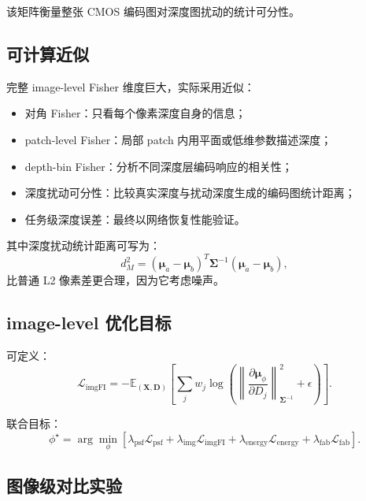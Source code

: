 \documentclass[11pt,a4paper,fontset=none]{ctexart}
\begin{document}
该矩阵衡量整张 CMOS 编码图对深度图扰动的统计可分性。

\subsection{可计算近似}

完整 image-level Fisher 维度巨大，实际采用近似：
\begin{itemize}
  \item 对角 Fisher：只看每个像素深度自身的信息；
  \item patch-level Fisher：局部 patch 内用平面或低维参数描述深度；
  \item depth-bin Fisher：分析不同深度层编码响应的相关性；
  \item 深度扰动可分性：比较真实深度与扰动深度生成的编码图统计距离；
  \item 任务级深度误差：最终以网络恢复性能验证。
\end{itemize}

其中深度扰动统计距离可写为：
\begin{equation}
  d_M^2
  =
  (\bm\mu_a-\bm\mu_b)^T
  \bm\Sigma^{-1}
  (\bm\mu_a-\bm\mu_b),
\end{equation}
比普通 L2 像素差更合理，因为它考虑噪声。

\subsection{image-level 优化目标}

可定义：
\begin{equation}
  \mathcal L_{\mathrm{imgFI}}
  =
  -
  \mathbb E_{(\bm X,\bm D)}
  \left[
  \sum_j
  w_j
  \log
  \left(
  \left\|
  \frac{\partial\bm\mu_\phi}{\partial D_j}
  \right\|_{\bm\Sigma^{-1}}^2
  +
  \epsilon
  \right)
  \right].
\end{equation}

联合目标：
\begin{equation}
  \phi^\star
  =
  \arg\min_\phi
  \left[
  \lambda_{\mathrm{psf}}\mathcal L_{\mathrm{psf}}
  +
  \lambda_{\mathrm{img}}\mathcal L_{\mathrm{imgFI}}
  +
  \lambda_{\mathrm{energy}}\mathcal L_{\mathrm{energy}}
  +
  \lambda_{\mathrm{fab}}\mathcal L_{\mathrm{fab}}
  \right].
\end{equation}

\subsection{图像级对比实验}
\end{document}
